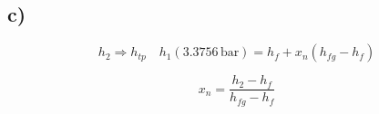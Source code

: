 

\subsection*{c)}
\[
h_2 \Rightarrow h_{tp} \quad h_1 (3.3756 \, \text{bar}) = h_f + x_n (h_{fg} - h_f)
\]

\[
x_n = \frac{h_2 - h_f}{h_{fg} - h_f}
\]